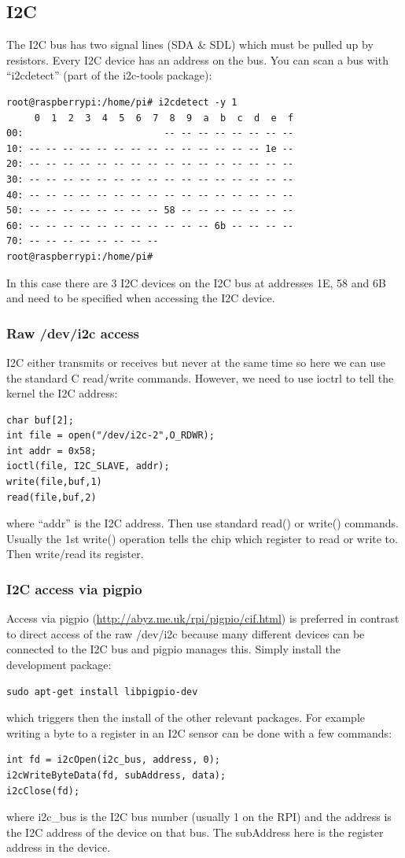 \documentclass[12pt]{report}
\begin{document}
\subsection{I2C}
The I2C bus has two signal lines (SDA \& SDL) which must be pulled up
by resistors. Every I2C device has an address on the bus. You can scan
a bus with ``i2cdetect'' (part of the i2c-tools package):
\begin{verbatim}
root@raspberrypi:/home/pi# i2cdetect -y 1
     0  1  2  3  4  5  6  7  8  9  a  b  c  d  e  f
00:                         -- -- -- -- -- -- -- -- 
10: -- -- -- -- -- -- -- -- -- -- -- -- -- -- 1e -- 
20: -- -- -- -- -- -- -- -- -- -- -- -- -- -- -- -- 
30: -- -- -- -- -- -- -- -- -- -- -- -- -- -- -- -- 
40: -- -- -- -- -- -- -- -- -- -- -- -- -- -- -- -- 
50: -- -- -- -- -- -- -- -- 58 -- -- -- -- -- -- -- 
60: -- -- -- -- -- -- -- -- -- -- -- 6b -- -- -- -- 
70: -- -- -- -- -- -- -- --                         
root@raspberrypi:/home/pi# 
\end{verbatim}
In this case there are 3 I2C devices on the I2C bus at addresses
1E, 58 and 6B and need to be specified when
accessing the I2C device.

\subsubsection{Raw /dev/i2c access}
I2C either transmits or receives but never at the same time so here we
can use the standard C read/write commands. However, we need to use ioctrl to tell
the kernel the I2C address:
\begin{verbatim}
char buf[2];
int file = open("/dev/i2c-2",O_RDWR);
int addr = 0x58;
ioctl(file, I2C_SLAVE, addr);
write(file,buf,1)
read(file,buf,2)
\end{verbatim}
where ``addr'' is the I2C address. Then use standard read()
or write() commands. Usually the 1st write() operation tells the chip
which register to read or write to. Then write/read its register.

\subsubsection{I2C access via pigpio}
Access via pigpio (\url{http://abyz.me.uk/rpi/pigpio/cif.html})
is preferred in contrast to direct
access of the raw /dev/i2c because many different devices
can be connected to the I2C bus and pigpio manages this.
Simply install the development package:
\begin{verbatim}
sudo apt-get install libpigpio-dev
\end{verbatim}
which triggers then the install of the other relevant packages.
For example writing a byte to a register in an I2C sensor can be done with a
few commands:
\begin{verbatim}
int fd = i2cOpen(i2c_bus, address, 0);
i2cWriteByteData(fd, subAddress, data);
i2cClose(fd);
\end{verbatim}
where i2c\_bus is the I2C bus number (usually 1 on the RPI)
and the address is the I2C address of the device on that bus.
The subAddress here is the register address in the device.
\end{document}
